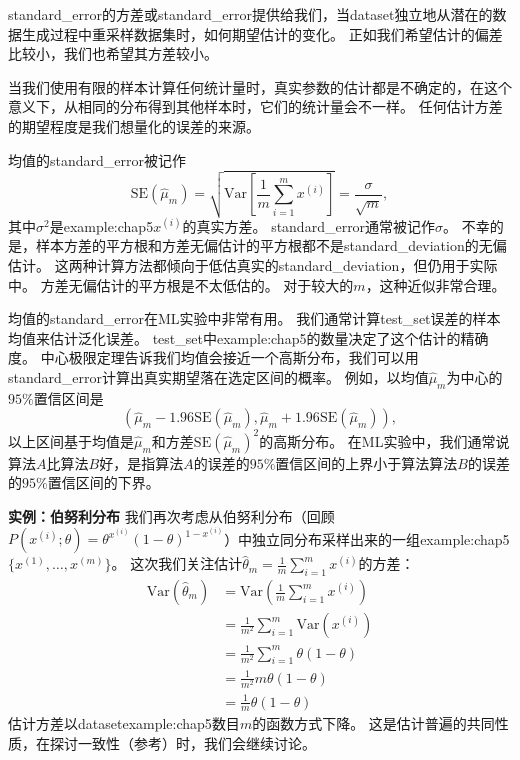\gls{standard_error}的方差或\gls{standard_error}提供给我们，当\gls{dataset}独立地从潜在的数据生成过程中重采样数据集时，如何期望估计的变化。
正如我们希望估计的偏差比较小，我们也希望其方差较小。

当我们使用有限的样本计算任何统计量时，真实参数的估计都是不确定的，在这个意义下，从相同的分布得到其他样本时，它们的统计量会不一样。
任何估计方差的期望程度是我们想量化的误差的来源。

均值的\gls{standard_error}被记作
\begin{equation}
\label{eq:5.46}
    \text{SE}(\hat{\mu}_m) = \sqrt{ \text{Var} \left[ \frac{1}{m} \sum_{i=1}^m x^{(i)} \right] } = \frac{\sigma}{\sqrt{m}},
\end{equation}
其中$\sigma^2$是\gls{example:chap5}$x^{(i)}$的真实方差。
\gls{standard_error}通常被记作$\sigma$。
不幸的是，样本方差的平方根和方差无偏估计的平方根都不是\gls{standard_deviation}的无偏估计。
这两种计算方法都倾向于低估真实的\gls{standard_deviation}，但仍用于实际中。
方差无偏估计的平方根是不太低估的。
对于较大的$m$，这种近似非常合理。


均值的\gls{standard_error}在\gls{ML}实验中非常有用。
我们通常计算\gls{test_set}误差的样本均值来估计泛化误差。
\gls{test_set}中\gls{example:chap5}的数量决定了这个估计的精确度。
中心极限定理告诉我们均值会接近一个高斯分布，我们可以用\gls{standard_error}计算出真实期望落在选定区间的概率。
例如，以均值$\hat{\mu}_m$为中心的$95\%$置信区间是
\begin{equation}
    ( \hat{\mu}_m - 1.96\text{SE}(\hat{\mu}_m), \hat{\mu}_m + 1.96 \text{SE}(\hat{\mu}_m) ),
\end{equation}
以上区间基于均值是$\hat{\mu}_m$和方差$\text{SE}(\hat{\mu}_m)^2$的高斯分布。
在\gls{ML}实验中，我们通常说算法$A$比算法$B$好，是指算法$A$的误差的$95\%$置信区间的上界小于算法算法$B$的误差的$95\%$置信区间的下界。

\textbf{实例：伯努利分布} \quad 我们再次考虑从伯努利分布（回顾$P(x^{(i)}; \theta) = \theta^{x^{(i)}} (1-\theta)^{1 - x^{(i)}}$）中独立同分布采样出来的一组\gls{example:chap5}$\{ x^{(1)}, \dots, x^{(m)} \}$。
这次我们关注估计$\hat{\theta}_m = \frac{1}{m} \sum_{i=1}^m x^{(i)}$的方差：
\begin{align}
    \text{Var}\left( \hat{\theta}_m \right) &= \text{Var}\left( \frac{1}{m} \sum_{i=1}^m x^{(i)} \right) \\
    &= \frac{1}{m^2} \sum_{i=1}^m \text{Var} \left( x^{(i)} \right) \\
    &= \frac{1}{m^2} \sum_{i=1}^m \theta (1 - \theta) \\
    &= \frac{1}{m^2} m\theta(1-\theta) \\
    &= \frac{1}{m} \theta(1-\theta)
\end{align} 
估计方差以\gls{dataset}\gls{example:chap5}数目$m$的函数方式下降。
这是估计普遍的共同性质，在探讨一致性（参考）时，我们会继续讨论。

